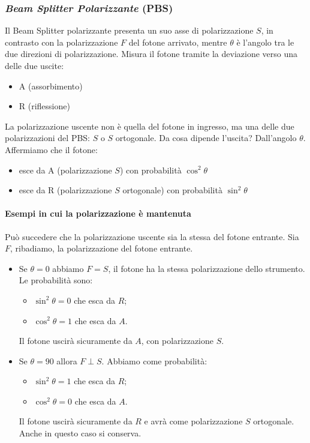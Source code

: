 \subsubsection{\emph{Beam Splitter Polarizzante} (PBS)}
Il Beam Splitter polarizzante presenta un suo asse di polarizzazione $S$, in contrasto con la polarizzazione $F$ del fotone arrivato, mentre $\theta$ è l'angolo tra le due direzioni di polarizzazione. Misura il fotone tramite la deviazione verso una delle due uscite: 
\begin{itemize}
	\item A (assorbimento)
	\item R (riflessione)
\end{itemize}
La polarizzazione uscente non è quella del fotone in ingresso, ma una delle due polarizzazioni del PBS: $S$ o $S$ ortogonale. Da cosa dipende l'uscita? Dall'angolo $\theta$. Affermiamo che il fotone:
\begin{itemize}
    \item esce da A (polarizzazione $S$) con probabilità $\cos^2 \theta$
    \item esce da R (polarizzazione $S$ ortogonale) con probabilità $\sin^2 \theta$
\end{itemize}
\paragraph{Esempi in cui la polarizzazione è mantenuta} Può succedere che la polarizzazione uscente sia la stessa del fotone entrante. Sia $F$, ribadiamo, la polarizzazione del fotone entrante.
\begin{itemize}
    \item Se $\theta = 0$ abbiamo $F=S$, il fotone ha la stessa polarizzazione dello strumento. Le probabilità sono: 
    \begin{multicols}{2}
    \begin{itemize}
    	\item $\sin^2 \theta=0$ che esca da $R$;
    	\item $\cos^2\theta=1$ che esca da $A$.
    \end{itemize}
	\end{multicols}
	Il fotone uscirà sicuramente da $A$, con polarizzazione $S$.
    \item Se $\theta = 90$ allora $F \perp S$. Abbiamo come probabilità: 
    \begin{multicols}{2}
    \begin{itemize}
    	\item $\sin^2 \theta = 1$ che esca da $R$;
    	\item $\cos^2 \theta = 0$ che esca da $A$.
    \end{itemize}
\end{multicols} Il fotone uscirà sicuramente da $R$ e avrà come polarizzazione $S$ ortogonale. Anche in questo caso si conserva.
\end{itemize}
